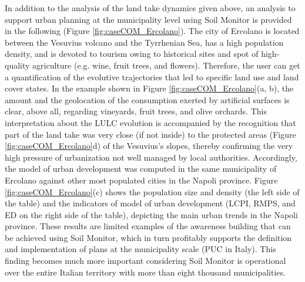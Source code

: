 \documentclass[APA,LATO1COL,doublespace]{WileyNJD-v2}
\begin{document}
In addition to the analysis of the land take dynamics given above, an analysis to support urban planning at the municipality level using Soil Monitor is provided in the following (Figure \ref{fig:caseCOM_Ercolano}).
The city of Ercolano is located between the Vesuvius volcano and the Tyrrhenian Sea, has a high population density, and is devoted to tourism owing to historical sites and spot of high-quality agriculture (e.g. wine, fruit trees, and flowers). 
Therefore, the user can get a quantification of the evolutive trajectories that led to specific land use and land cover states. 
In the example shown in Figure \ref{fig:caseCOM_Ercolano}(a, b), the amount and the geolocation of the consumption exerted by artificial surfaces is clear, above all, regarding vineyards, fruit trees, and olive orchards. 
This interpretation about the LULC evolution is accompanied by the recognition that part of the land take was very close (if not inside) to the protected areas (Figure \ref{fig:caseCOM_Ercolano}d) of the Vesuvius's slopes, thereby confirming the very high pressure of urbanization not well managed by local authorities. 
Accordingly, the model of urban development was computed in the same municipality of Ercolano against other most populated cities in the Napoli province. 
Figure \ref{fig:caseCOM_Ercolano}(c) shows the population size and density (the left side of the table) and the indicators of model of urban development (LCPI, RMPS, and ED on the right side of the table), depicting the main urban trends in the Napoli province.
These results are limited examples of the awareness building that can be achieved using Soil Monitor, which in turn profitably supports the definition and implementation of plans at the municipality scale (PUC in Italy).
This finding becomes much more important considering Soil Monitor is operational over the entire Italian territory with more than eight thousand municipalities.
\end{document}

